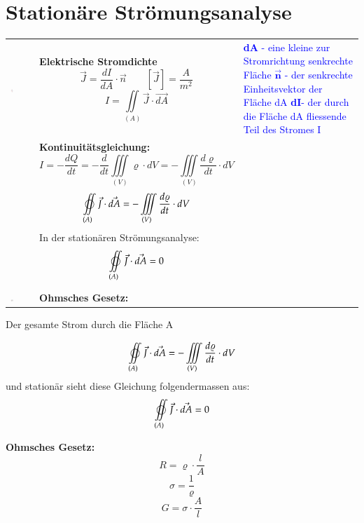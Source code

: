 \section{Stationäre Strömungsanalyse}

\begin{tabular}[h]{ C{.2\linewidth} P{.3\linewidth} P{.4\linewidth} }
	{\vspace{0pt}\includegraphics[width = 0.15\textwidth]{images/ElStromdichte}} & \textbf{Elektrische Stromdichte} \[ \vec{J} = \dfrac{dI}{dA}\cdot \vec{n}\qquad [\vec{J}] = \dfrac{A}{m^2} \] \[I = \iint\limits_{(A)}\vec{J}\cdot\vec{dA} \] & {\scriptsize \textcolor{blue}{\textbf{dA} - eine kleine zur Stromrichtung senkrechte Fläche \newline $\vec{\textbf{n}}$ - der senkrechte Einheitsvektor der Fläche dA \newline 
\textbf{dI}- der durch die Fläche dA fliessende Teil des Stromes I}} \\
& \textbf{Kontinuitätsgleichung:} \newline
 \[ I = -\dfrac{dQ}{dt} = -\dfrac{d}{dt}\iiint\limits_{(V)}\varrho\cdot dV = -\iiint\limits_{(V)}\dfrac{d\varrho}{dt}\cdot dV \] \newline \[ \varoiint\limits_{(A)}\vec{J}\cdot\vec{dA} = -\iiint\limits_{(V)}\dfrac{d\varrho}{dt}\cdot dV \] 
 {\scriptsize{In der stationären Strömungsanalyse:}} \newline 
 \[ \varoiint\limits_{(A)}\vec{J}\cdot\vec{dA} = 0\] & \\
 {\vspace{0pt}\includegraphics[width = 0.15\textwidth]{images/OhmschesGesetz}}& \textbf{Ohmsches Gesetz:} & \\
	
\end{tabular}

 Der gesamte Strom durch die Fläche A




\[ \varoiint\limits_{(A)}\vec{J}\cdot\vec{dA} = -\iiint\limits_{(V)}\dfrac{d\varrho}{dt}\cdot dV \] 
und stationär sieht diese Gleichung folgendermassen aus:
\[ \varoiint\limits_{(A)}\vec{J}\cdot\vec{dA} = 0\]

\textbf{Ohmsches Gesetz:}
\[ R = \varrho\cdot\dfrac{l}{A}\]
\[ \sigma = \dfrac{1}{\varrho}\]
\[ G = \sigma\cdot\dfrac{A}{l} \]

\clearpage